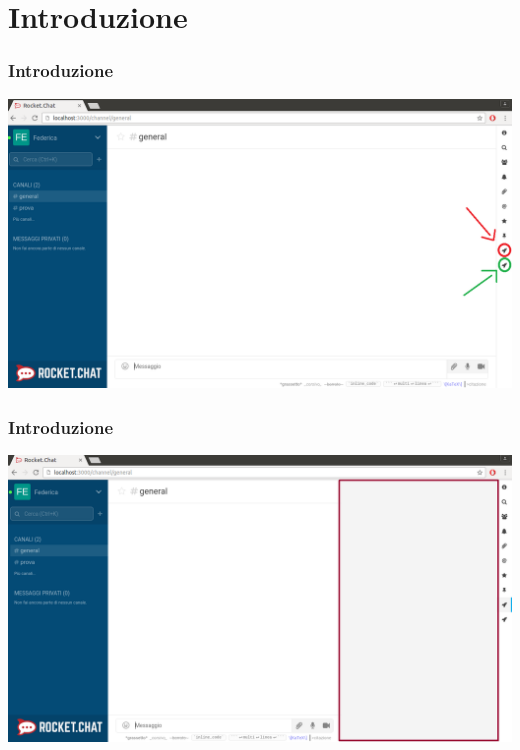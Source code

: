 \section{Introduzione}
\begin{frame}
  \frametitle{Introduzione}
  \begin{center}
  	\includegraphics[scale=0.25]{img/f1.png}
  \end{center}

\end{frame}

\begin{frame}
  \frametitle{Introduzione}
 \begin{center}
 	\includegraphics[scale=0.25]{img/f2.png}
 \end{center}
  
\end{frame}

